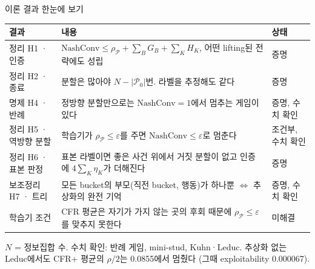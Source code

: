 \documentclass[aspectratio=169,11pt]{beamer}
\newcommand{\Pc}{\mathcal P}
\begin{document}
\begin{frame}{이론 결과 한눈에 보기}
\footnotesize
\setlength{\tabcolsep}{4pt}\begin{tabular}{p{2.9cm}p{7.9cm}p{2.3cm}}
\toprule
결과 & 내용 & 상태\\
\midrule
정리 H1 · 인증 & $\mathrm{NashConv}\le\rho_{\Pc}+\sum_B G_B+\sum_K H_K$, 어떤 lifting된 전략에도 성립 & \textcolor{deepblue}{증명}\\
정리 H2 · 종료 & 분할은 많아야 $N-\lvert\Pc_0\rvert$번. 라벨을 추정해도 같다 & \textcolor{deepblue}{증명}\\
명제 H4 · 반례 & 정방향 분할만으로는 $\mathrm{NashConv}=1$에서 멈추는 게임이 있다 & \textcolor{deepblue}{증명, 수치 확인}\\
정리 H5 · 역방향 분할 & 학습기가 $\rho_{\Pc}\le\varepsilon$를 주면 $\mathrm{NashConv}\le\varepsilon$로 멈춘다 & \textcolor{deeporange}{조건부, 수치 확인}\\
정리 H6 · 표본 판정 & 표본 라벨이면 좋은 사건 위에서 거짓 분할이 없고 인증에 $4\sum_K\eta_K$가 더해진다 & \textcolor{deepblue}{증명}\\
보조정리 H7 · 트리 & 모든 bucket의 부모(직전 bucket, 행동)가 하나뿐 $\Leftrightarrow$ 추상화의 완전 기억 & \textcolor{deepblue}{증명, 수치 확인}\\
\midrule
학습기 조건 & CFR 평균은 자기가 가지 않는 곳의 후회 때문에 $\rho_{\Pc}\le\varepsilon$를 맞추지 못한다 & \textcolor{deeporange}{미해결}\\
\bottomrule
\end{tabular}

\vspace{1pt}
{\scriptsize\color{muted} $N$ = 정보집합 수. 수치 확인: 반례 게임, mini-stud, Kuhn·Leduc. 추상화 없는 Leduc에서도 CFR+ 평균의 $\rho/2$는 0.0855에서 멈췄다 (그때 exploitability 0.000067).}
\end{frame}
\end{document}
